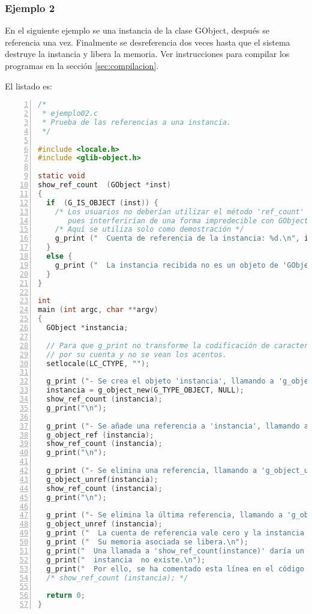\subsubsection{Ejemplo 2}
En el siguiente ejemplo se una instancia de la clase \textsf{GObject}, después se referencia una vez.
Finalmente se desreferencia dos veces hasta que el sistema destruye la instancia y libera la memoria.
Ver instrucciones para compilar los programas en la sección \ref{sec:compilacion}.

El listado es:
\begin{lstlisting}[language=C, numbers=left]
/*
 * ejemplo02.c
 * Prueba de las referencias a una instancia.
 */

#include <locale.h>
#include <glib-object.h>

static void
show_ref_count  (GObject *inst)
{
  if  (G_IS_OBJECT (inst)) {
    /* Los usuarios no deberían utilizar el método 'ref_count' en sus programas.
       pues interferirían de una forma impredecible con GObject */
    /* Aquí se utiliza solo como demostración */
    g_print ("  Cuenta de referencia de la instancia: %d.\n", inst->ref_count);
  }
  else {
    g_print ("  La instancia recibida no es un objeto de 'GObjectClass'.\n");
  }
}

int
main (int argc, char **argv)
{
  GObject *instancia;

  // Para que g_print no transforme la codificación de caracteres
  // por su cuenta y no se vean los acentos.
  setlocale(LC_CTYPE, "");

  g_print ("- Se crea el objeto 'instancia', llamando a 'g_object_new'.\n");
  instancia = g_object_new(G_TYPE_OBJECT, NULL);
  show_ref_count (instancia);
  g_print("\n");
  
  g_print ("- Se añade una referencia a 'instancia', llamando a 'g_object_ref'.\n");
  g_object_ref (instancia);
  show_ref_count (instancia);
  g_print("\n");

  g_print ("- Se elimina una referencia, llamando a 'g_object_unref'.\n");
  g_object_unref(instancia);
  show_ref_count (instancia);
  g_print("\n");

  g_print ("- Se elimina la última referencia, llamando a 'g_object_unref'.\n");
  g_object_unref (instancia);
  g_print ("  La cuenta de referencia vale cero y la instancia se destruye.\n");
  g_print ("  Su memoria asociada se libera.\n");
  g_print("  Una llamada a 'show_ref_count(instance)' daría un error, pues la\n");
  g_print("  instancia  no existe.\n");
  g_print("  Por ello, se ha comentado esta línea en el código fuente.\n");
  /* show_ref_count (instancia); */
  
  return 0;
}
\end{lstlisting}

